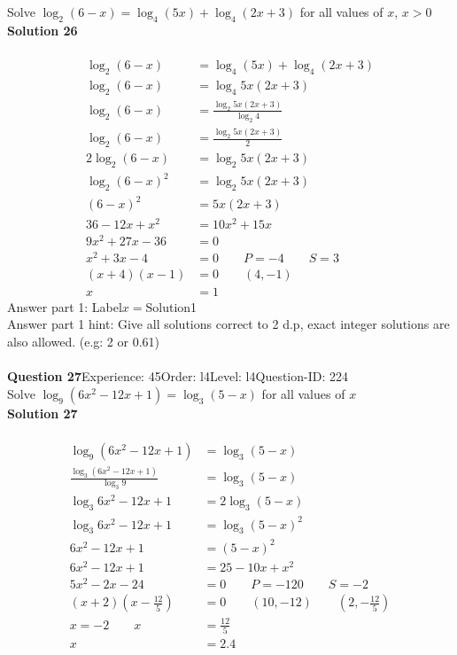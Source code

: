 \documentclass{article}
\begin{document}
Solve $\log_{2}(6-x)=\log_{4}(5x)+\log_{4}(2x+3)$ for all values of $x$, $x>0$\\[4pt]
\noindent\textbf{Solution 26}\\[2pt]
\\[-35pt]\begin{align*}
\log_{2}(6-x)&=\log_{4}(5x)+\log_{4}(2x+3)\\[2pt]
\log_{2}(6-x)&=\log_{4}5x(2x+3)\\[2pt]
\log_{2}(6-x)&=\displaystyle\frac{\log_{2}5x(2x+3)}{\log_{2}4}\\[2pt]
\log_{2}(6-x)&=\displaystyle\frac{\log_{2}5x(2x+3)}{2}\\[2pt]
2\log_{2}(6-x)&=\log_{2}5x(2x+3)\\[2pt]
\log_{2}(6-x)^2&=\log_{2}5x(2x+3)\\[2pt]
(6-x)^2&=5x(2x+3)\\[2pt]
36-12x+x^2&=10x^2+15x\\[2pt]
9x^2+27x-36&=0\\[2pt]
x^2+3x-4&=0\qquad P=-4 \qquad S=3\\[2pt]
(x+4)(x-1)&=0 \qquad (4,-1)\\[2pt]
x&=1
\end{align*}
Answer part 1: \hspace{10pt}Label\hspace{10pt}$x=$\hspace{10pt}Solution\hspace{10pt}1\\
Answer part 1 hint: \hspace{15pt}Give all solutions correct to 2 d.p, exact integer solutions are also allowed. (e.g: 2 or 0.61)\\
\\[4pt]
\noindent\textbf{Question 27}\hspace{20pt}Experience: 45\hspace{20pt}Order: l4\hspace{20pt}Level: l4\hspace{20pt}Question-ID: 224\\[2pt]
Solve $\log_{9}(6x^2-12x+1)=\log_{3}(5-x)$ for all values of $x$\\[4pt]
\noindent\textbf{Solution 27}\\[2pt]
\\[-35pt]\begin{align*}
\log_{9}(6x^2-12x+1)&=\log_{3}(5-x)\\[2pt]
\displaystyle\frac{\log_{3}(6x^2-12x+1)}{\log_{3}9}&=\log_{3}(5-x)\\[2pt]
\log_{3}6x^2-12x+1&=2\log_{3}(5-x)\\[2pt]
\log_{3}6x^2-12x+1&=\log_{3}(5-x)^2\\[2pt]
6x^2-12x+1&=(5-x)^2\\[2pt]
6x^2-12x+1&=25-10x+x^2\\[2pt]
5x^2-2x-24&=0\qquad P=-120 \qquad S=-2\\[2pt]
(x+2)\left(x-\displaystyle\frac{12}{5}\right)&=0\qquad (10,-12) \qquad \left(2,-\displaystyle\frac{12}{5}\right)\\[2pt]
x=-2\qquad x&=\displaystyle\frac{12}{5}\\[2pt]
x&=2.4
\end{align*}
\end{document}
